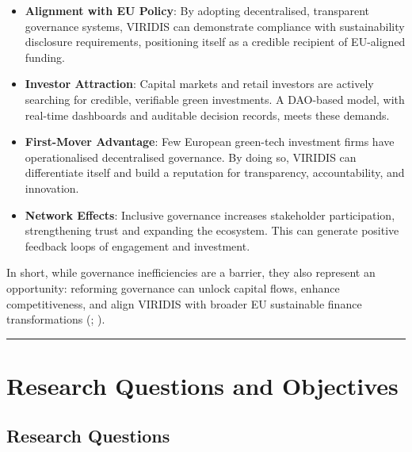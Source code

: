 \documentclass[
  english,
  12pt,
  oneside,
  open=any]{scrbook}
\providecommand{\tightlist}{%
  \setlength{\itemsep}{0pt}\setlength{\parskip}{0pt}}\usepackage{longtable,booktabs,array}
\begin{document}
\begin{itemize}
\tightlist
\item
  \textbf{Alignment with EU Policy}: By adopting decentralised,
  transparent governance systems, VIRIDIS can demonstrate compliance
  with sustainability disclosure requirements, positioning itself as a
  credible recipient of EU-aligned funding.\\
\item
  \textbf{Investor Attraction}: Capital markets and retail investors are
  actively searching for credible, verifiable green investments. A
  DAO-based model, with real-time dashboards and auditable decision
  records, meets these demands.\\
\item
  \textbf{First-Mover Advantage}: Few European green-tech investment
  firms have operationalised decentralised governance. By doing so,
  VIRIDIS can differentiate itself and build a reputation for
  transparency, accountability, and innovation.\\
\item
  \textbf{Network Effects}: Inclusive governance increases stakeholder
  participation, strengthening trust and expanding the ecosystem. This
  can generate positive feedback loops of engagement and investment.
\end{itemize}

In short, while governance inefficiencies are a barrier, they also
represent an opportunity: reforming governance can unlock capital flows,
enhance competitiveness, and align VIRIDIS with broader EU sustainable
finance transformations
(;
).

\begin{center}\rule{0.5\linewidth}{0.5pt}\end{center}

\section{Research Questions and Objectives}\label{sec-rq}

\subsection{Research Questions}\label{research-questions}
\end{document}
